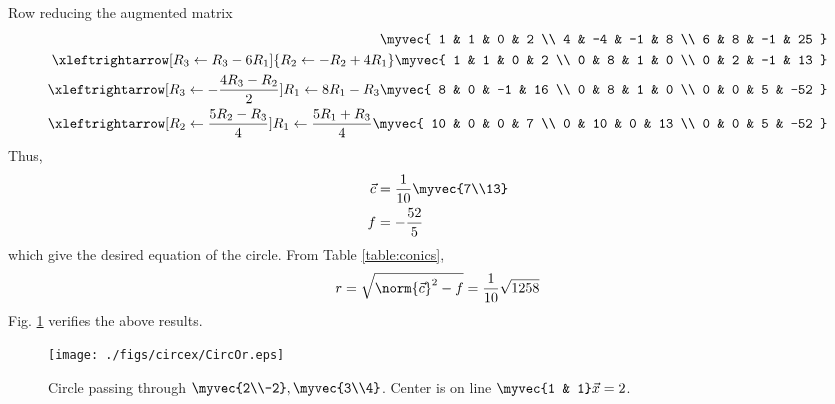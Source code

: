 Row reducing the augmented matrix
\begin{align}
\myvec{
1 & 1 & 0 & 2
\\
4 & -4 & -1 & 8
\\ 
6 & 8 & -1  & 25
}
\\
\xleftrightarrow[R_3 \leftarrow R_3 -6R_1]{R_2 \leftarrow -R_2+4R_1}
\myvec{
1 & 1 & 0 & 2
\\
0 & 8 & 1 & 0
\\ 
0 & 2 & -1  & 13
}
\\
\xleftrightarrow[R_3 \leftarrow -\frac{4R_3 -R_2}{2}]{R_1 \leftarrow 8R_1-R_3}
\myvec{
8 & 0 & -1 & 16
\\
0 & 8 & 1 & 0
\\ 
0 & 0 & 5  & -52
}
\\
\xleftrightarrow[R_2 \leftarrow \frac{5R_2 -R_3}{4}]{R_1 \leftarrow \frac{5R_1+R_3}{4}}
\myvec{
10 & 0 & 0 & 7
\\
0 & 10 & 0 & 13
\\ 
0 & 0 & 5  & -52
}
\end{align}
Thus, 
\begin{align}
\vec{c} &= \frac{1}{10}\myvec{7\\13}
\\
f &=-\frac{52}{5}
\end{align}
which give the desired equation of the circle.
From Table \ref{table:conics},
%
\begin{align}
 r =  \sqrt{\norm{\vec{c}}^2-f} = \frac{1}{10}\sqrt{1258}
\end{align}
Fig. \ref{fig:CircOr}	verifies the above results.

\begin{figure}[!ht]
\centering
\texttt{[image: ./figs/circex/CircOr.eps]}
\caption{Circle passing through $\myvec{2\\-2},\myvec{3\\4}$. Center is on line $\myvec{1 & 1}\vec{x}=2$. }
\label{fig:CircOr}	
\end{figure}

